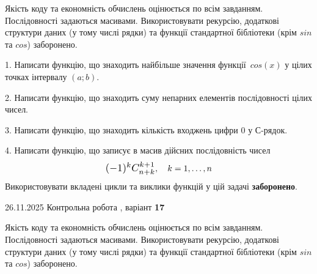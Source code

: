 \documentclass[11pt, ukrainian]{article}
\begin{document}
{{{{{{{{{{{{{{{%

{
Якість коду та економність обчислень оцінюється по всім завданням. Послідовності задаються масивами. Використовувати рекурсію, додаткові структури даних (у тому числі рядки) та функції стандартної бібліотеки (крім $sin$ та $cos$) заборонено.

\vspace{2mm}

\begin {large}
1. Написати функцію, що знаходить найбільше значення функції~$cos(x)$ у цілих точках інтервалу $(a; b)$.

\vspace{2mm}


2. Написати функцію, що знаходить суму непарних елементів послідовності цілих чисел.

\vspace{2mm}


3. Написати функцію, що знаходить кількість входжень цифри 0 у С-рядок.

\vspace{2mm}


4. 
Написати функцію, що записує в масив дійсних послідовність чисел
$$\scalebox{1.2}{$(-1)^{k}C_{n+k}^{k+1}$}, \quad k=1,\ldots,n$$
\quad Використовувати вкладені цикли та виклики функцій у цій задачі \textbf{заборонено}.

\vspace{2mm}

\end{large}
\vspace{20mm}


{{26.11.2025 Контрольна робота , варіант  \No \textbf { 17 }\par}}


{
Якість коду та економність обчислень оцінюється по всім завданням. Послідовності задаються масивами. Використовувати рекурсію, додаткові структури даних (у тому числі рядки) та функції стандартної бібліотеки (крім $sin$ та $cos$) заборонено.

}}}}}}}}}}}}}}}}}
\end{document}
